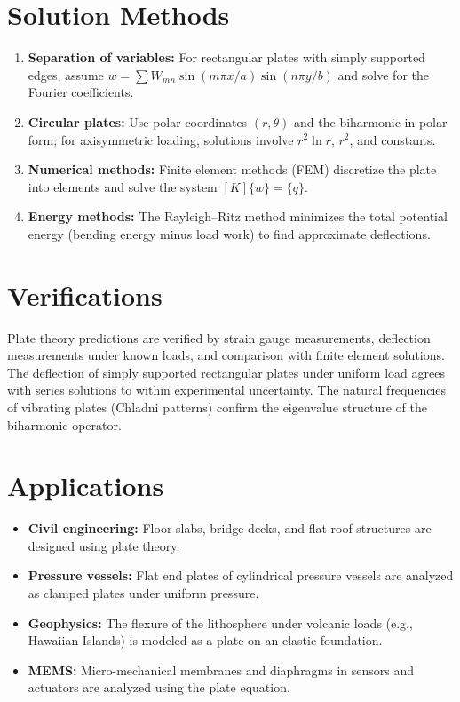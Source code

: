 \documentclass[11pt,openright]{book}
\begin{document}
\section*{Solution Methods}

\begin{enumerate}
  \item \textbf{Separation of variables:} For rectangular plates with simply supported edges, assume $w = \sum W_{mn}\sin(m\pi x/a)\sin(n\pi y/b)$ and solve for the Fourier coefficients.
  \item \textbf{Circular plates:} Use polar coordinates $(r,\theta)$ and the biharmonic in polar form; for axisymmetric loading, solutions involve $r^{2}\ln r$, $r^{2}$, and constants.
  \item \textbf{Numerical methods:} Finite element methods (FEM) discretize the plate into elements and solve the system $[K]\{w\} = \{q\}$.
  \item \textbf{Energy methods:} The Rayleigh--Ritz method minimizes the total potential energy (bending energy minus load work) to find approximate deflections.
\end{enumerate}
\section*{Verifications}

Plate theory predictions are verified by strain gauge measurements, deflection measurements under known loads, and comparison with finite element solutions. The deflection of simply supported rectangular plates under uniform load agrees with series solutions to within experimental uncertainty. The natural frequencies of vibrating plates (Chladni patterns) confirm the eigenvalue structure of the biharmonic operator.
\section*{Applications}

\begin{itemize}
  \item \textbf{Civil engineering:} Floor slabs, bridge decks, and flat roof structures are designed using plate theory.
  \item \textbf{Pressure vessels:} Flat end plates of cylindrical pressure vessels are analyzed as clamped plates under uniform pressure.
  \item \textbf{Geophysics:} The flexure of the lithosphere under volcanic loads (e.g., Hawaiian Islands) is modeled as a plate on an elastic foundation.
  \item \textbf{MEMS:} Micro-mechanical membranes and diaphragms in sensors and actuators are analyzed using the plate equation.
\end{itemize}
\end{document}
